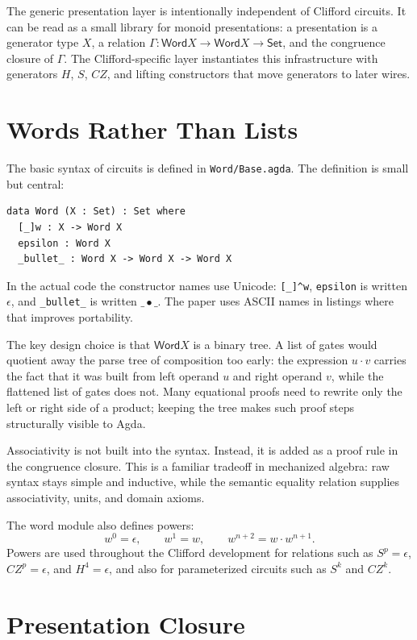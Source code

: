 \documentclass[sigplan,screen,review,anonymous]{acmart}
\newcommand{\Agda}{Agda\xspace}
\newcommand{\Word}{\mathsf{Word}}
\newcommand{\file}[1]{\texttt{#1}}
\begin{document}
The generic presentation layer is intentionally independent of
Clifford circuits.  It can be read as a small library for monoid
presentations: a presentation is a generator type \(X\), a relation
\(\Gamma : \Word X \to \Word X \to \mathsf{Set}\), and the congruence
closure of \(\Gamma\).  The Clifford-specific layer instantiates this
infrastructure with generators \(H\), \(S\), \(CZ\), and lifting
constructors that move generators to later wires.

\section{Words Rather Than Lists}

The basic syntax of circuits is defined in \file{Word/Base.agda}.
The definition is small but central:

\begin{lstlisting}
data Word (X : Set) : Set where
  [_]w : X -> Word X
  epsilon : Word X
  _bullet_ : Word X -> Word X -> Word X
\end{lstlisting}

In the actual code the constructor names use Unicode:
\texttt{[\_]\^{}w}, \texttt{epsilon} is written \(\epsilon\), and
\texttt{\_bullet\_} is written \(\_\bullet\_\).  The paper uses ASCII
names in listings where that improves portability.

The key design choice is that \(\Word X\) is a binary tree.  A list of
gates would quotient away the parse tree of composition too early:
the expression \(u \cdot v\) carries the fact that it was built from
left operand \(u\) and right operand \(v\), while the flattened list
of gates does not.  Many equational proofs need to rewrite only the
left or right side of a product; keeping the tree makes such proof
steps structurally visible to \Agda.

Associativity is not built into the syntax.  Instead, it is added as
a proof rule in the congruence closure.  This is a familiar tradeoff
in mechanized algebra: raw syntax stays simple and inductive, while
the semantic equality relation supplies associativity, units, and
domain axioms.

The word module also defines powers:
\[
  w^0 = \epsilon,\qquad
  w^1 = w,\qquad
  w^{n+2} = w \cdot w^{n+1}.
\]
Powers are used throughout the Clifford development for relations
such as \(S^p = \epsilon\), \(CZ^p = \epsilon\), and \(H^4 =
\epsilon\), and also for parameterized circuits such as \(S^k\) and
\(CZ^k\).

\section{Presentation Closure}
\end{document}
